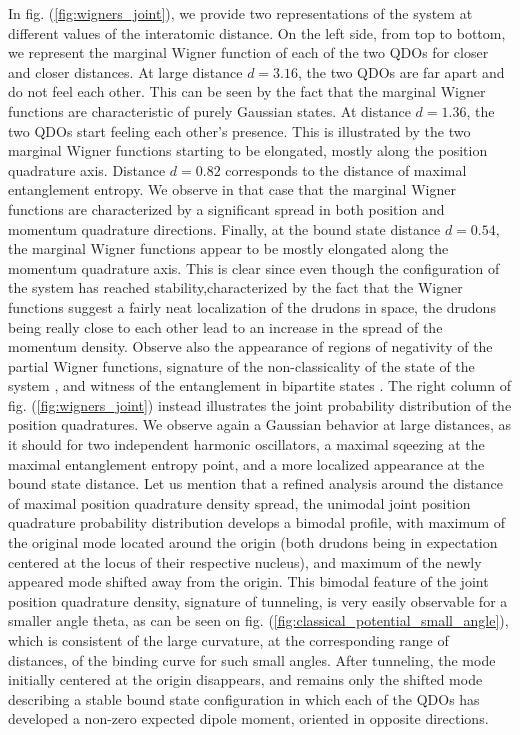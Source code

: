 \documentclass[reprint, amsmath, amssymb, floatfix, aps, pra]{revtex4-2}
\begin{document}
    In fig. (\ref{fig:wigners_joint}), we provide two representations of the system at different values of the interatomic distance. On the left side, from top to bottom, we represent the marginal Wigner function of each of the two QDOs for closer and closer distances. At large distance $d=3.16$, the two QDOs are far apart and do not feel each other. This can be seen by the fact that the marginal Wigner functions are characteristic of purely Gaussian states. At distance $d=1.36$, the two QDOs start feeling each other's presence. This is illustrated by the two marginal Wigner functions starting to be elongated, mostly along the position quadrature axis. Distance $d=0.82$ corresponds to the distance of maximal entanglement entropy. We observe in that case that the marginal Wigner functions are characterized by a significant spread in both position and momentum quadrature directions. Finally, at the bound state distance $d=0.54$, the marginal Wigner functions appear to be mostly elongated along the momentum quadrature axis. This is clear since even though the configuration of the system has reached stability,characterized by the fact that the Wigner functions suggest a fairly neat localization of the drudons in space, the drudons being really close to each other lead to an increase in the spread of the momentum density. Observe also the appearance of regions of negativity of the partial Wigner functions, signature of the non-classicality of the state of the system \cite{Chabaud:2021pnh}, and witness of the entanglement in bipartite states \cite{arkhipov2018negativity}. The right column of fig. (\ref{fig:wigners_joint}) instead illustrates the joint probability distribution of the position quadratures. We observe again a Gaussian behavior at large distances, as it should for two independent harmonic oscillators, a maximal sqeezing at the maximal entanglement entropy point, and a more localized appearance at the bound state distance. Let us mention that a refined analysis around the distance of maximal position quadrature density spread, the unimodal joint position quadrature probability distribution develops a bimodal profile, with maximum of the original mode located around the origin (both drudons being in expectation centered at the locus of their respective nucleus), and maximum of the newly appeared mode shifted away from the origin. This bimodal feature of the joint position quadrature density, signature of tunneling, is very easily observable for a smaller angle theta, as can be seen on fig. (\ref{fig:classical_potential_small_angle}), which is consistent of the large curvature, at the corresponding range of distances, of the binding curve for such small angles. After tunneling, the mode initially centered at the origin disappears, and remains only the shifted mode describing a stable bound state configuration in which each of the QDOs has developed a non-zero expected dipole moment, oriented in opposite directions.
    \newline
\end{document}

